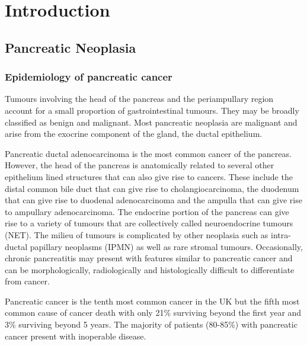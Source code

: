 
\chapter{Introduction}
\label{ch_intro}


\clearpage

\section{Pancreatic Neoplasia}

\subsection{Epidemiology of pancreatic cancer}
\parencite{crozier_preoperative_2007}
Tumours involving the head of the pancreas and the periampullary region account for a small proportion of gastrointestinal tumours. They may be broadly classified as benign and malignant. Most pancreatic neoplasia are malignant and arise from the exocrine component of the gland, the ductal epithelium. 

Pancreatic ductal adenocarcinoma is the most common cancer of the pancreas. However, the head of the pancreas is anatomically related to several other epithelium lined structures that can also give rise to cancers. These include the distal common bile duct that can give rise to cholangiocarcinoma, the duodenum that can give rise to duodenal adenocarcinoma and the ampulla that can give rise to ampullary adenocarcinoma. The endocrine portion of the pancreas can give rise to a variety of tumours that are collectively called neuroendocrine tumours (NET). The milieu of tumours is complicated by other neoplasia such as intra-ductal papillary neoplasms (IPMN) as well as rare stromal tumours. Occasionally, chronic pancreatitis may present with features similar to pancreatic cancer and can be morphologically, radiologically and histologically difficult to differentiate from cancer.

Pancreatic cancer is the tenth most common cancer in the UK but the fifth most common cause of cancer death with only 21\% surviving beyond the first year and 3\% surviving beyond 5 years.\parencite{cancerresearchuk_cancer_2014} The majority of patients (80-85\%) with pancreatic cancer present with inoperable disease.\parencite{cancerresearchuk_cancer_2014,sener_pancreatic_1999}

